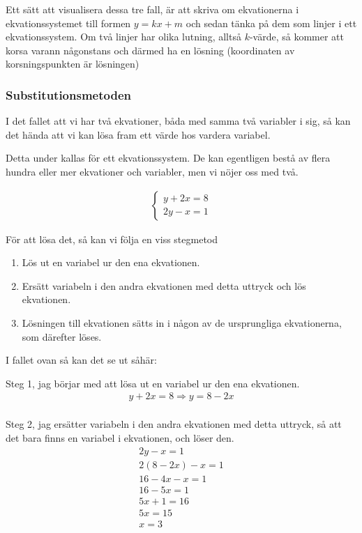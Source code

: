 Ett sätt att visualisera dessa tre fall, är att skriva om ekvationerna i ekvationssystemet till formen $y=kx+m$ och sedan tänka på dem som linjer i ett ekvationssystem. Om två linjer har olika lutning, alltså $k$-värde, så kommer att korsa varann någonstans och därmed ha en lösning (koordinaten av korsningspunkten är lösningen)

\subsubsection{Substitutionsmetoden}
\label{Substitutionsmetoden}

I det fallet att vi har två ekvationer, båda med samma två variabler i sig, så kan det hända att vi kan lösa fram ett värde hos vardera variabel.

Detta under kallas för ett ekvationssystem. De kan egentligen bestå av flera hundra eller mer ekvationer och variabler, men vi nöjer oss med två.

\begin{align}
	\begin{cases}
		y+2x=8 \\
		2y-x = 1
	\end{cases}
\end{align}

För att lösa det, så kan vi följa en viss stegmetod

\begin{enumerate}
	\item Lös ut en variabel ur den ena ekvationen.
	\item Ersätt variabeln i den andra ekvationen med detta uttryck och lös ekvationen.
	\item Lösningen till ekvationen sätts in i någon av de ursprungliga ekvationerna, som därefter löses.
\end{enumerate}

I fallet ovan så kan det se ut såhär:

Steg 1, jag börjar med att lösa ut en variabel ur den ena ekvationen.
\begin{align}
	y+2x = 8 \Rightarrow y = 8-2x \\
\end{align}

Steg 2, jag ersätter variabeln i den andra ekvationen med detta uttryck, så att det bara finns en variabel i ekvationen, och löser den.
\begin{align}
	2y-x = 1 \\
	2(8-2x)-x = 1 \\
	16-4x-x = 1 \\
	16-5x = 1 \\
	5x + 1 = 16 \\
	5x = 15 \\
	x = 3
\end{align}

